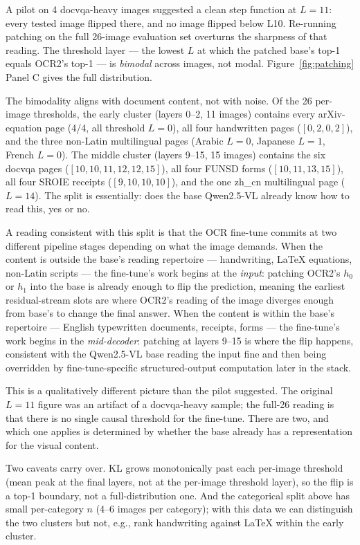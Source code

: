 \documentclass[10pt,twocolumn,letterpaper]{article}
\begin{document}
A pilot on 4 docvqa-heavy images suggested a clean step function at $L = 11$: every tested image flipped there, and no image flipped below L10. Re-running patching on the full 26-image evaluation set overturns the sharpness of that reading. The threshold layer --- the lowest $L$ at which the patched base's top-1 equals OCR2's top-1 --- is \emph{bimodal} across images, not modal. Figure~\ref{fig:patching} Panel C gives the full distribution.

The bimodality aligns with document content, not with noise. Of the 26 per-image thresholds, the early cluster (layers 0--2, 11 images) contains every arXiv-equation page (4/4, all threshold $L = 0$), all four handwritten pages ($[0, 2, 0, 2]$), and the three non-Latin multilingual pages (Arabic $L = 0$, Japanese $L = 1$, French $L = 0$). The middle cluster (layers 9--15, 15 images) contains the six docvqa pages ($[10, 10, 11, 12, 12, 15]$), all four FUNSD forms ($[10, 11, 13, 15]$), all four SROIE receipts ($[9, 10, 10, 10]$), and the one zh\_cn multilingual page ($L = 14$). The split is essentially: does the base Qwen2.5-VL already know how to read this, yes or no.

A reading consistent with this split is that the OCR fine-tune commits at two different pipeline stages depending on what the image demands. When the content is outside the base's reading repertoire --- handwriting, LaTeX equations, non-Latin scripts --- the fine-tune's work begins at the \emph{input}: patching OCR2's $h_0$ or $h_1$ into the base is already enough to flip the prediction, meaning the earliest residual-stream slots are where OCR2's reading of the image diverges enough from base's to change the final answer. When the content is within the base's repertoire --- English typewritten documents, receipts, forms --- the fine-tune's work begins in the \emph{mid-decoder}: patching at layers 9--15 is where the flip happens, consistent with the Qwen2.5-VL base reading the input fine and then being overridden by fine-tune-specific structured-output computation later in the stack.

This is a qualitatively different picture than the pilot suggested. The original $L = 11$ figure was an artifact of a docvqa-heavy sample; the full-26 reading is that there is no single causal threshold for the fine-tune. There are two, and which one applies is determined by whether the base already has a representation for the visual content.

Two caveats carry over. KL grows monotonically past each per-image threshold (mean peak at the final layers, not at the per-image threshold layer), so the flip is a top-1 boundary, not a full-distribution one. And the categorical split above has small per-category $n$ (4--6 images per category); with this data we can distinguish the two clusters but not, e.g., rank handwriting against LaTeX within the early cluster.
\end{document}
